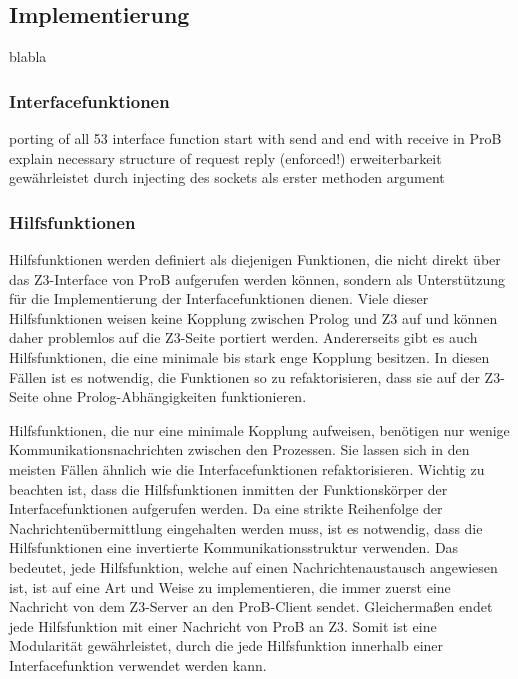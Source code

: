 \subsection{Implementierung}

blabla

\subsubsection{Interfacefunktionen}

porting of all 53 interface function
start with send and end with receive in ProB
explain necessary structure of request reply (enforced!)
erweiterbarkeit gewährleistet durch injecting des sockets als erster methoden argument



\subsubsection{Hilfsfunktionen}
\label{subsec:helper-functions}

Hilfsfunktionen werden definiert als diejenigen Funktionen, die nicht direkt über das Z3-Interface von ProB aufgerufen werden können,
sondern als Unterstützung für die Implementierung der Interfacefunktionen dienen.
Viele dieser Hilfsfunktionen weisen keine Kopplung zwischen Prolog und Z3 auf und können daher problemlos auf die Z3-Seite portiert werden.
Andererseits gibt es auch Hilfsfunktionen, die eine minimale bis stark enge Kopplung besitzen.
In diesen Fällen ist es notwendig, die Funktionen so zu refaktorisieren, dass sie auf der Z3-Seite ohne Prolog-Abhängigkeiten funktionieren.

Hilfsfunktionen, die nur eine minimale Kopplung aufweisen, benötigen nur wenige Kommunikationsnachrichten zwischen den Prozessen.
Sie lassen sich in den meisten Fällen ähnlich wie die Interfacefunktionen refaktorisieren.
Wichtig zu beachten ist, dass die Hilfsfunktionen inmitten der Funktionskörper der Interfacefunktionen aufgerufen werden.
Da eine strikte Reihenfolge der Nachrichtenübermittlung eingehalten werden muss, ist es notwendig, dass die Hilfsfunktionen
eine invertierte Kommunikationsstruktur verwenden.
Das bedeutet, jede Hilfsfunktion, welche auf einen Nachrichtenaustausch angewiesen ist, ist auf eine Art und Weise zu implementieren,
die immer zuerst eine Nachricht von dem Z3-Server an den ProB-Client sendet.
Gleichermaßen endet jede Hilfsfunktion mit einer Nachricht von ProB an Z3.
Somit ist eine Modularität gewährleistet, durch die jede Hilfsfunktion innerhalb einer Interfacefunktion verwendet werden kann.

